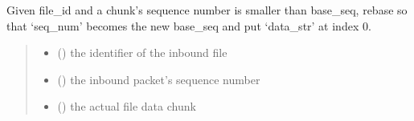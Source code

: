 \documentclass[letterpaper,10pt,oneside,english,openany]{sphinxmanual}
\begin{document}
\begin{fulllineitems}
\begin{fulllineitems}
\label{\detokenize{modules:id2}}
\pysigstartsignatures
\pysigline
{}
\pysigstopsignatures
\end{fulllineitems}


\begin{fulllineitems}
\label{\detokenize{modules:receiver_rdt.Receiver.rebase_packets}}
\pysigstartsignatures
\pysiglinewithargsret
{}
{\sphinxparamcomma {}\sphinxparamcomma {}}
{}
\pysigstopsignatures
\sphinxAtStartPar
Given file\_id and a chunk’s sequence number is smaller than base\_seq,
rebase so that ‘seq\_num’ becomes the new base\_seq and put ‘data\_str’
at index 0.
\begin{quote}\begin{description}
\begin{itemize}
\item {} 
\sphinxAtStartPar
{} () \textendash{} the identifier of the inbound file

\item {} 
\sphinxAtStartPar
{} () \textendash{} the inbound packet’s sequence number

\item {} 
\sphinxAtStartPar
{} () \textendash{} the actual file data chunk

\end{itemize}

\end{description}\end{quote}

\end{fulllineitems}



\end{fulllineitems}
\end{document}
